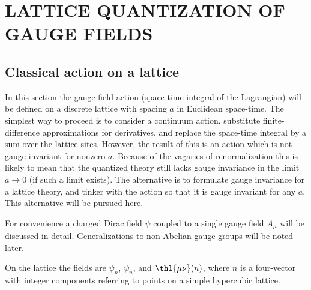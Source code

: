 \section{LATTICE QUANTIZATION OF GAUGE FIELDS}\label{sec:lattice}

\subsection{Classical action on a lattice}\label{sec:classical}

In this section the gauge-field action (space-time integral of the
Lagrangian) will be defined on a discrete lattice with spacing $a$ in
Euclidean space-time.  The simplest way to proceed is to consider a
continuum action, substitute finite-difference approximations for
derivatives, and replace the space-time integral by a sum over the
lattice sites.  However, the result of this is an action which is not
gauge-invariant for nonzero $a$.  Because of the vagaries of
renormalization this is likely to mean that the quantized theory still
lacks gauge invariance in the limit $a \to 0$ (if such a limit exists).
The alternative is to formulate gauge invariance for a lattice theory,
and tinker with the action so that it is gauge invariant for any $a$.
This alternative will be pursued here.

For convenience a charged Dirac field $\psi$ coupled to a single gauge
field $A_{\mu}$ will be discussed in detail.  Generalizations to
non-Abelian gauge groups will be noted later.

On the lattice the fields are $\psi_{n}$, $\bar\psi_{n}$, and
$\thl{\mu\nu}(n)$, where $n$ is a four-vector with integer components
referring to points on a simple hypercubic lattice.

